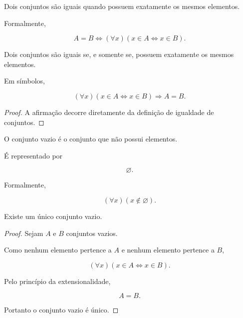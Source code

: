 \documentclass[../../main]{subfiles}
\begin{document}
\begin{defn}
	\label{def:matematica:teoria-conjuntos:fundamentos:igualdade-conjuntos}

	Dois conjuntos são iguais quando possuem exatamente os mesmos
	elementos.

	Formalmente,

	\[
		A = B
		\iff
		(\forall x)
		(x \in A \Leftrightarrow x \in B).
	\]
\end{defn}

\begin{prop}
	\label{prop:matematica:teoria-conjuntos:fundamentos:extensionalidade}

	Dois conjuntos são iguais se, e somente se, possuem exatamente os
	mesmos elementos.

	Em símbolos,

	\[
		(\forall x)
		(x \in A \Leftrightarrow x \in B)
		\Rightarrow
		A = B.
	\]
\end{prop}

\begin{proof}

	A afirmação decorre diretamente da definição de igualdade de
	conjuntos.

\end{proof}

\begin{defn}
	\label{def:matematica:teoria-conjuntos:fundamentos:conjunto-vazio}

	O conjunto vazio é o conjunto que não possui elementos.

	É representado por

	\[
		\varnothing.
	\]

	Formalmente,

	\[
		(\forall x)
		(x \notin \varnothing).
	\]
\end{defn}

\begin{prop}
	\label{prop:matematica:teoria-conjuntos:fundamentos:unicidade-conjunto-vazio}

	Existe um único conjunto vazio.
\end{prop}

\begin{proof}

	Sejam \(A\) e \(B\) conjuntos vazios.

	Como nenhum elemento pertence a \(A\) e nenhum elemento pertence a
	\(B\),

	\[
		(\forall x)
		(x \in A \Leftrightarrow x \in B).
	\]

	Pelo princípio da extensionalidade,

	\[
		A = B.
	\]

	Portanto o conjunto vazio é único.

\end{proof}
\end{document}
